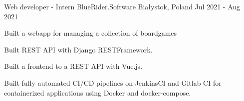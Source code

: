 \begin{cventries}
  \vspace{3.5mm}

  \cventry
    {Web developer - Intern} %
    {BlueRider.Software} %
    {Białystok, Poland} %
    {Jul 2021 - Aug 2021} %
    {
      \begin{cvitems} %
        \item {Built a webapp for managing a collection of boardgames}
        \item {Built REST API with Django RESTFramework.}
        \item {Built a frontend to a REST API with Vue.js.}
        \item {Built fully automated CI/CD pipelines on JenkinsCI and Gitlab CI for containerized applications using Docker and docker‑compose.}
      \end{cvitems}
    }

\end{cventries}
